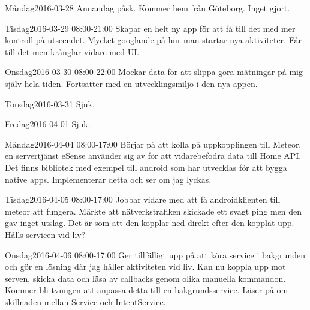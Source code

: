 \documentclass[a4paper,oneside]{book}
\begin{document}
\begin{diary}{Måndag}{2016-03-28}
	Annandag påsk. Kommer hem från Göteborg. Inget gjort.
\end{diary}

\begin{diary}{Tisdag}{2016-03-29 08:00-21:00}
	Skapar en helt ny app för att få till det med mer kontroll på utseendet. Mycket googlande på hur man startar nya aktiviteter. Får till det men krånglar vidare med UI.
\end{diary}

\begin{diary}{Onsdag}{2016-03-30 08:00-22:00}
	Mockar data för att slippa göra mätningar på mig själv hela tiden. Fortsätter med en utvecklingsmiljö i den nya appen.
\end{diary}

\begin{diary}{Torsdag}{2016-03-31}
	Sjuk.
\end{diary}

\begin{diary}{Fredag}{2016-04-01}
	Sjuk.
\end{diary}
\newpage

\begin{diary}{Måndag}{2016-04-04 08:00-17:00}
	Börjar på att kolla på uppkopplingen till Meteor, en servertjänst eSense använder sig av för att vidarebefodra data till Home API. Det finns bibliotek  med exempel till android som har utvecklas för att bygga native apps. Implementerar detta och ser om jag lyckas.
\end{diary}

\begin{diary}{Tisdag}{2016-04-05 08:00-17:00}
	Jobbar vidare med att få androidklienten till meteor att fungera. Märkte att nätverkstrafiken skickade ett svagt ping men den gav inget utslag. Det är som att den kopplar ned direkt efter den kopplat upp. Hålls servicen vid liv?
\end{diary}

\begin{diary}{Onsdag}{2016-04-06 08:00-17:00}
	Ger tillfälligt upp på att köra service i bakgrunden och gör en lösning där jag håller aktiviteten vid liv. Kan nu koppla upp mot serven, skicka data och läsa av callbacks genom olika manuella kommandon. Kommer bli tvungen att anpassa detta till en bakgrundsservice. Läser på om skillnaden mellan Service och IntentService.
\end{diary}
\end{document}
